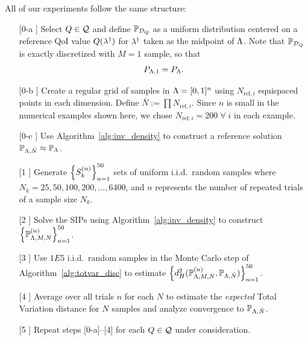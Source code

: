 All of our experiments follow the same structure:
\begin{itemize}
\item[[0-a]] Select $Q\in\mathcal{Q}$ and define $\mathbb{P}_{\mathcal{D}_Q}$ as a uniform distribution centered on a reference QoI value $Q(\lambda^\dagger)$ for $\lambda^\dagger$ taken as the midpoint of ${\Lambda}$.
Note that $\mathbb{P}_{\mathcal{D}_Q}$ is exactly discretized with $M=1$ sample, so that
\[
P_{{\Lambda}, 1} = P_{\Lambda}.
\]
\item[[0-b]] Create a regular grid of samples in ${\Lambda}=[0,1]^n$ using $N_{\text{ref},i}$ equispaced points in each dimension.
Define $\bar{N} := \prod N_{\text{ref},i}$.
Since $n$ is small in the numerical examples shown here, we chose $N_{\text{ref},i} = 200 \; \forall \; i$ in each example.
\item[[0-c]] Use Algorithm~\ref{alg:inv_density} to construct a reference solution $\mathbb{P}_{{\Lambda},\bar{N}}\approx \mathbb{P}_{\Lambda}$.
\item[[1]] Generate $\left\{S_k^{(n)}\right\}_{n=1}^{50}$ sets of uniform i.i.d.~random samples where $N_k = 25, 50, 100, 200, \hdots, 6400$, and $n$ represents the number of repeated trials of a sample size $N_k$.
\item[[2]] Solve the SIPs using Algorithm~\ref{alg:inv_density} to construct $\left\{\mathbb{P}_{{\Lambda},M,N}^{(n)}\right\}_{n=1}^{50}$.
\item[[3]] Use $1E5$ i.i.d.~random samples in the Monte Carlo step of Algorithm~\ref{alg:totvar_disc} to estimate $\left\{d_H^2( \mathbb{P}_{{\Lambda},M,N}^{(n)}, \mathbb{P}_{{\Lambda},\bar{N}})\right\}_{n=1}^{50}$.
\item[[4]] Average over all trials $n$ for each $N$ to estimate the {\em expected} Total Variation distance for $N$ samples and analyze convergence to $\mathbb{P}_{{\Lambda},\bar{N}}$.
\item[[5]] Repeat steps [0-a]--[4] for each $Q\in\mathcal{Q}$ under consideration.
\end{itemize}

\FloatBarrier
